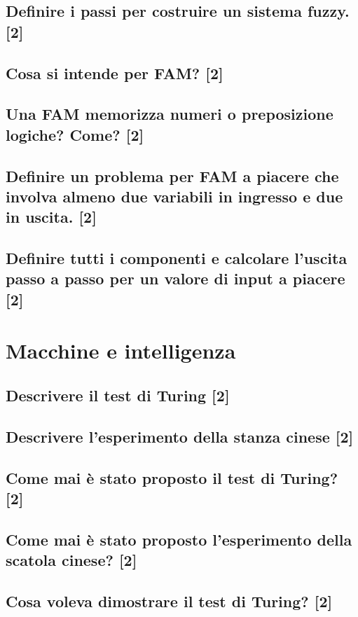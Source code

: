 \documentclass[\main/main.tex]{subfiles}
\begin{document}
\subsection{Definire i passi per costruire un sistema fuzzy. [2]}
\subsection{Cosa si intende per FAM? [2]}
\subsection{Una FAM memorizza numeri o preposizione logiche? Come? [2]}
\subsection{Definire un problema per FAM a piacere che involva almeno due variabili in ingresso e due in uscita. [2]}
\subsection{Definire tutti i componenti e calcolare l'uscita passo a passo per un valore di input a piacere [2]}

\clearpage
\section{Macchine e intelligenza}

\subsection{Descrivere il test di Turing [2]}
\subsection{Descrivere l'esperimento della stanza cinese [2]}
\subsection{Come mai è stato proposto il test di Turing? [2]}
\subsection{Come mai è stato proposto l'esperimento della scatola cinese? [2]}
\subsection{Cosa voleva dimostrare il test di Turing? [2]}
\end{document}
